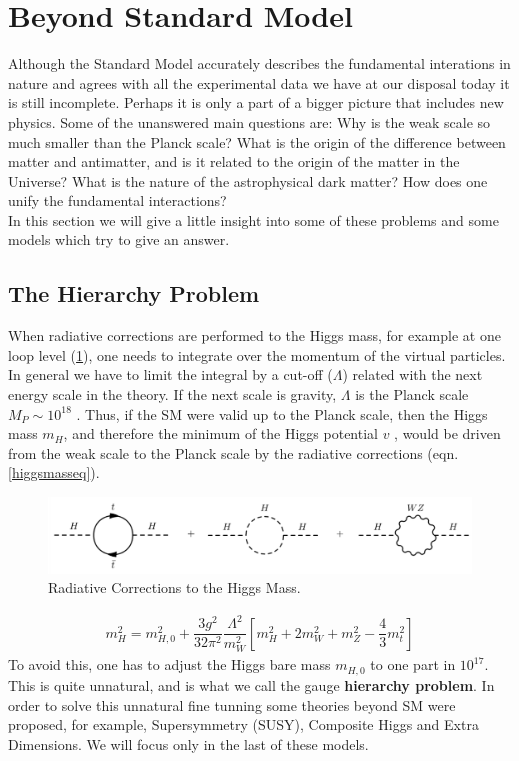 \section{Beyond Standard Model}

Although the Standard Model accurately describes the fundamental interations in nature and agrees with all the experimental data we have at our disposal today it is still incomplete. Perhaps it is only a part of a bigger picture that includes new physics. Some of the unanswered main questions are:  Why is the weak scale so much smaller than the Planck scale?  What is the origin of the difference between matter and antimatter, and is it related to the origin of the matter in the Universe? What is the nature of the astrophysical dark matter? How does one unify the fundamental interactions?\\
\indent
In this section we will give a little insight into some of these problems and some models which try to give an answer.

\subsection{The Hierarchy Problem}\label{hierarchy}

When radiative corrections are performed to the Higgs mass, for example at one loop level (\cref{figurehiggsmass}), one needs to integrate over  the momentum of the virtual particles. In general we have to limit the integral by a cut-off ($\Lambda$) related with  the next energy scale in the theory.
If the next scale is gravity, $\Lambda$ is the Planck scale $M_{P} \sim 10^{18}$ \gev. Thus, if the SM were valid up to the Planck scale, then the Higgs mass $m_{H}$,	and therefore the minimum of the Higgs potential $v$ , would be driven from the weak scale to the Planck scale by the radiative corrections (eqn. \ref{higgsmasseq}).
\begin{figure}[H]
  \centering
\includegraphics[width=15cm]{SM_chapter_plots/higgsmass}
\caption{Radiative Corrections to the Higgs Mass. \label{figurehiggsmass}}
\end{figure}
\begin{eqnarray}\label{higgsmasseq}
m_{H}^{2} = m_{H,0}^{2} + \dfrac{3 g^{2}}{32 \pi^{2}}\dfrac{\Lambda^{2}}{m_{W}^{2}}\left[ m_{H}^{2} + 2m_{W}^{2} + m_{Z}^{2} - \dfrac{4}{3} m_{t}^{2}  \right] 
\end{eqnarray}
To avoid this, one
has to adjust the Higgs bare mass $m_{H,0}$ to one
part in $10^{17}$. This is quite unnatural, and is what we call the
gauge \textbf{hierarchy problem}.
In order to solve this unnatural fine tunning some theories beyond SM were proposed, for example, Supersymmetry (SUSY), Composite Higgs and Extra Dimensions. We will focus only in the last of these models.

